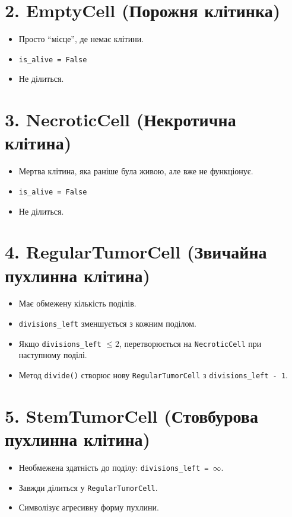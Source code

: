 \documentclass{article}
\begin{document}
\section*{2. \textbf{EmptyCell (Порожня клітинка)}}
\begin{itemize}
    \item Просто ``місце'', де немає клітини.
    \item \texttt{is\_alive = False}
    \item Не ділиться.
\end{itemize}

\section*{3. \textbf{NecroticCell (Некротична клітина)}}
\begin{itemize}
    \item Мертва клітина, яка раніше була живою, але вже не функціонує.
    \item \texttt{is\_alive = False}
    \item Не ділиться.
\end{itemize}

\section*{4. \textbf{RegularTumorCell (Звичайна пухлинна клітина)}}
\begin{itemize}
    \item Має обмежену кількість поділів.
    \item \texttt{divisions\_left} зменшується з кожним поділом.
    \item Якщо \texttt{divisions\_left} $\leq 2$, перетворюється на \texttt{NecroticCell} при наступному поділі.
    \item Метод \texttt{divide()} створює нову \texttt{RegularTumorCell} з \texttt{divisions\_left - 1}.
\end{itemize}

\section*{5. \textbf{StemTumorCell (Стовбурова пухлинна клітина)}}
\begin{itemize}
    \item Необмежена здатність до поділу: \texttt{divisions\_left = \(\infty\)}.
    \item Завжди ділиться у \texttt{RegularTumorCell}.
    \item Символізує агресивну форму пухлини.
\end{itemize}
\end{document}

